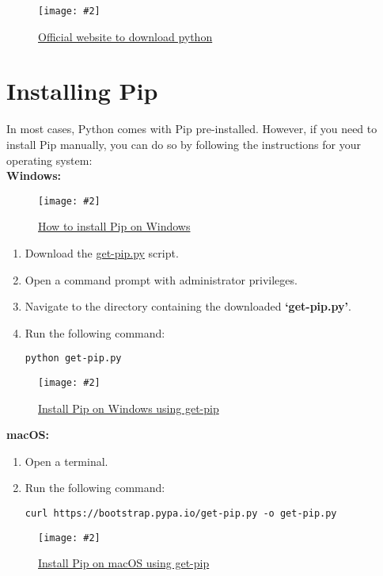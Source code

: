 \documentclass[a4paper, 12pt]{report}
\newcommand{\commandbox}[1]{%
    \begin{tcolorbox}[colback=green!10, colframe=green!50!black, rounded corners]
        #1
    \end{tcolorbox}%
}
\newcommand{\addimage}[4][]{%
    \begin{figure}[ht]
        \centering
        \texttt{[image: \#2]}
        \caption{#3}
        \label{#4}
    \end{figure}%
}
\begin{document}
        \addimage[width=0.8\textwidth]{pythonwebsite.png}{\href{https://www.python.org/downloads/}{Official website to download python}}{fig:python website}

    \newpage

    
    \section{Installing Pip}
        In most cases, Python comes with Pip pre-installed. However, if you need to install Pip manually, you can do so by following the instructions for your operating system:\\

        \textbf{Windows:}

        \addimage[width=0.8\textwidth]{PipOnWindows.jpeg}{\href{https://th.bing.com/th/id/OIP.PbcC89a1KSoYHLKVORN7ogAAAA?pid=ImgDet&rs=1}{How to install Pip on Windows}}{fig:install pip on windows}
        
        \begin{enumerate}        
            \item Download the \href{https://bootstrap.pypa.io/get-pip.py}{get-pip.py} script.
            \item Open a command prompt with administrator privileges.
            \item Navigate to the directory containing the downloaded \textbf{`get-pip.py'}.
            \item Run the following command:
            \commandbox{\texttt{python get-pip.py}}
            
        \end{enumerate}

        \addimage[width=0.8\textwidth]{getPip.png}{\href{https://www.jesusninoc.com/wp-content/uploads/2017/07/Installing-pip-with-get-pip-py.png}{Install Pip on Windows using get-pip}}{fig:Windows get-pip}

        \newpage

        \textbf{macOS:}
            \begin{enumerate}
                \item Open a terminal.
                \item Run the following command:
                \commandbox{\texttt{curl https://bootstrap.pypa.io/get-pip.py -o get-pip.py}}
            \end{enumerate}

        \addimage[width=0.8\textwidth]{getPipMac.png}{\href{https://phoenixnap.com/kb/wp-content/uploads/2021/09/install-pip-via-get-pip-py.png}{Install Pip on macOS using get-pip}}{fig:macOS get-pip}
        
\end{document}
